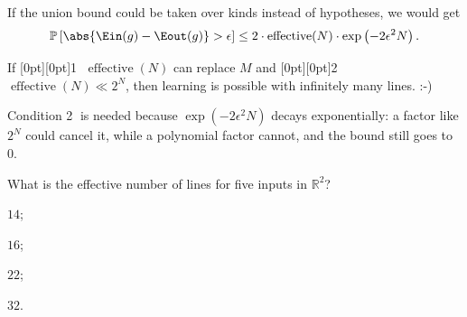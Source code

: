 If the union bound could be taken over kinds instead of hypotheses, we would
get
\[
    \mathbb{P}\left[ \abs{\Ein(g) - \Eout(g)} > \epsilon \right]
    \le 2 \cdot \operatorname{effective}(N) \cdot \exp \left( -2 \epsilon^2 N \right) .
\]

\begin{moral}
    If \raisebox{0pt}[0pt][0pt]{\textcircled{\scriptsize 1}}
    \(\operatorname{effective}(N)\) can replace \(M\) and
    \raisebox{0pt}[0pt][0pt]{\textcircled{\scriptsize 2}}
    \(\operatorname{effective}(N) \ll 2^N\), then learning is possible with
    infinitely many lines. :-)
\end{moral}

\begin{intuition}
    Condition \textcircled{\scriptsize 2} is needed because
    \(\exp(-2\epsilon^2 N)\) decays exponentially: a factor like \(2^N\) could
    cancel it, while a polynomial factor cannot, and the bound still goes to
    \(0\).
\end{intuition}

\begin{exercise}
    What is the effective number of lines for five inputs in \(\mathbb{R}^2\)?
    \begin{enumerate*}[(1)]
        \item \(14\); \item \(16\); \item \(22\); \item \(32\).
    \end{enumerate*}
\end{exercise}

